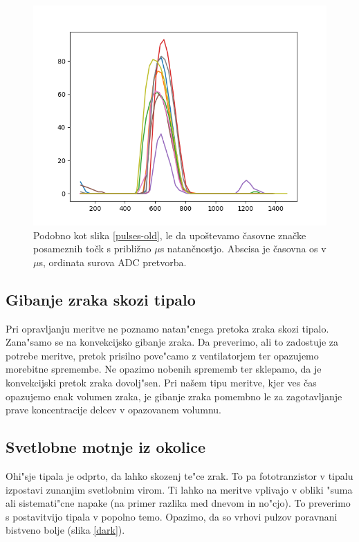 \documentclass[12pt,a4paper]{article}
\begin{document}
\begin{figure}[H]
	\begin{center}
		\includegraphics[width=12cm]{aligned.png}
		\caption{Podobno kot slika \ref{pulses-old}, le da upoštevamo časovne značke posameznih točk s približno $\mu$s natančnostjo. Abscisa je časovna os v $\mu$s, ordinata surova ADC pretvorba.}
		\label{aligned}
	\end{center}
\end{figure}

\subsection{Gibanje zraka skozi tipalo}
Pri opravljanju meritve ne poznamo natan"cnega pretoka zraka skozi tipalo. Zana"samo se na konvekcijsko gibanje zraka. Da preverimo, ali to zadostuje za potrebe meritve, pretok prisilno pove"camo z ventilatorjem ter opazujemo morebitne spremembe. Ne opazimo nobenih sprememb ter sklepamo, da je konvekcijski pretok zraka dovolj"sen. Pri našem tipu meritve, kjer ves čas opazujemo enak volumen zraka, je gibanje zraka pomembno le za zagotavljanje prave koncentracije delcev v opazovanem volumnu. 

\subsection{Svetlobne motnje iz okolice}
Ohi"sje tipala je odprto, da lahko skozenj te"ce zrak. To pa fototranzistor v tipalu izpostavi zunanjim svetlobnim virom. Ti lahko na meritve vplivajo v obliki "suma ali sistemati"cne napake (na primer razlika med dnevom in no"cjo). To preverimo s postavitvijo tipala v popolno temo. Opazimo, da so vrhovi pulzov poravnani bistveno bolje (slika \ref{dark}). 
\end{document}
